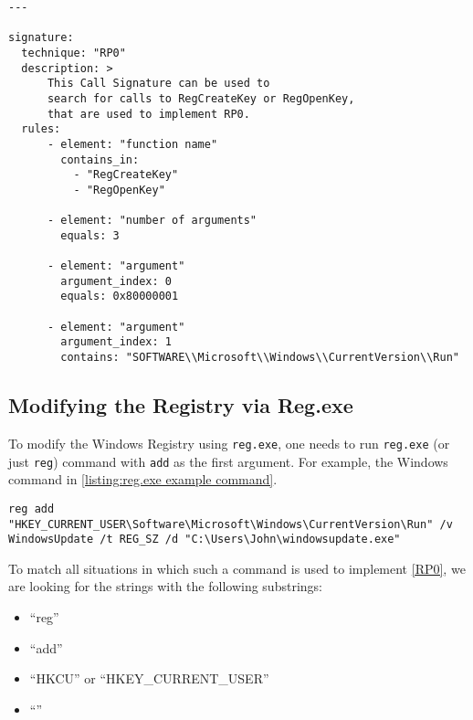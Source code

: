 \begin{lstlisting}[label={listing:call signature run key windows api}, caption={A Call Signature for \autoref{RP0}.}, captionpos=b]
---

signature:
  technique: "RP0"
  description: >
      This Call Signature can be used to
      search for calls to RegCreateKey or RegOpenKey,
      that are used to implement RP0.
  rules:
      - element: "function name"
        contains_in:
          - "RegCreateKey"
          - "RegOpenKey"

      - element: "number of arguments"
        equals: 3

      - element: "argument"
        argument_index: 0
        equals: 0x80000001

      - element: "argument"
        argument_index: 1
        contains: "SOFTWARE\\Microsoft\\Windows\\CurrentVersion\\Run"
\end{lstlisting}

\subsection{Modifying the Registry via Reg.exe}
To modify the Windows Registry using \texttt{reg.exe}, one needs to run \texttt{reg.exe} (or just \texttt{reg}) command with \texttt{add} as the first argument. For example, the Windows command in \autoref{listing:reg.exe example command}.

\begin{lstlisting}[label={listing:reg.exe example command}, caption={A Windows Command that implements \autoref{RP0}.}, captionpos=b]
  reg add "HKEY_CURRENT_USER\Software\Microsoft\Windows\CurrentVersion\Run" /v WindowsUpdate /t REG_SZ /d "C:\Users\John\windowsupdate.exe"
\end{lstlisting}

To match all situations in which such a command is used to implement \autoref{RP0}, we are looking for the strings with the following substrings:
\begin{itemize}
  \item ``reg''
  \item ``add''
  \item ``HKCU'' or ``HKEY\_CURRENT\_USER''
  \item ``''
\end{itemize}

